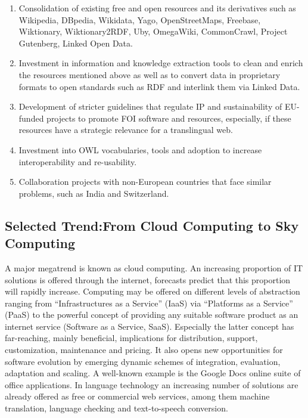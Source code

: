 \documentclass[10pt, plain]{../../metanetpaper}
\begin{document}
\begin{multicols}{2}
\begin{enumerate}
\item Consolidation of existing free and open resources and its derivatives such as Wikipedia, DBpedia, Wikidata, Yago, OpenStreetMaps, Freebase, Wiktionary, Wiktionary2RDF, Uby, OmegaWiki, CommonCrawl,  Project Gutenberg, Linked Open Data.
\item Investment in information and knowledge extraction tools to clean and enrich the resources mentioned above as well as to convert data in proprietary formats to open standards such as RDF and interlink them via Linked Data.
\item Development of stricter guidelines that regulate IP and sustainability of EU-funded projects to promote FOI software and resources, especially, if these resources have a strategic relevance for a translingual web.
\item Investment into OWL vocabularies, tools and adoption to increase interoperability and re-usability.
\item Collaboration projects with non-European countries that face similar problems, such as India and Switzerland.
\end{enumerate}

\subsection[Selected Trend: From Cloud Computing to Sky Computing]{Selected Trend:\newline From Cloud Computing to Sky Computing}
\label{sec:cloud-sky-computing}

%

A major megatrend is known as cloud computing. An increasing proportion of IT solutions is offered through the internet, forecasts predict that this proportion will rapidly increase. Computing may be offered on different levels of abstraction ranging from “Infrastructures as a Service” (IaaS) via “Platforms as a Service” (PaaS) to the powerful concept of providing any suitable software product as an internet service (Software as a Service, SaaS). Especially the latter concept has far-reaching, mainly beneficial, implications for distribution, support, customization, maintenance and pricing. It also opens new opportunities for software evolution by emerging dynamic schemes of integration, evaluation, adaptation and scaling. A well-known example is the Google Docs online suite of office applications. In language technology an increasing number of solutions are already offered as free or commercial web services, among them machine translation, language checking and text-to-speech conversion.


\end{multicols}
\end{document}
